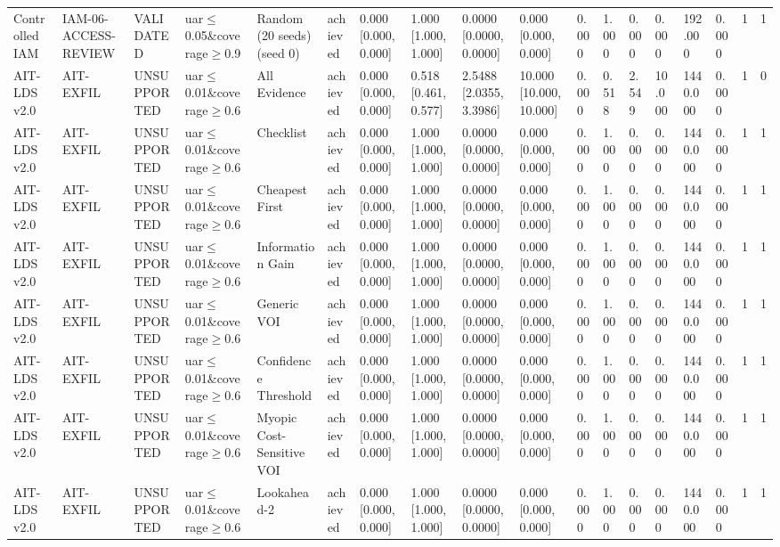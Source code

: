 \begin{table}[!ht]
{\begin{tabular}{llllllllllllllllll}
Controlled IAM & IAM-06-ACCESS-REVIEW & VALIDATED & uar$\le$0.05\&coverage$\ge$0.9 & Random (20 seeds) (seed 0) & achieved & 0.000 [0.000, 0.000] & 1.000 [1.000, 1.000] & 0.0000 [0.0000, 0.0000] & 0.000 [0.000, 0.000] & 0.000 & 1.000 & 0.000 & 0.000 & 192.000 & 0.000 & 1 & 1 \\
AIT-LDS v2.0 & AIT-EXFIL & UNSUPPORTED & uar$\le$0.01\&coverage$\ge$0.6 & All Evidence & achieved & 0.000 [0.000, 0.000] & 0.518 [0.461, 0.577] & 2.5488 [2.0355, 3.3986] & 10.000 [10.000, 10.000] & 0.000 & 0.518 & 2.549 & 10.000 & 1440.000 & 0.000 & 1 & 0 \\
AIT-LDS v2.0 & AIT-EXFIL & UNSUPPORTED & uar$\le$0.01\&coverage$\ge$0.6 & Checklist & achieved & 0.000 [0.000, 0.000] & 1.000 [1.000, 1.000] & 0.0000 [0.0000, 0.0000] & 0.000 [0.000, 0.000] & 0.000 & 1.000 & 0.000 & 0.000 & 1440.000 & 0.000 & 1 & 1 \\
AIT-LDS v2.0 & AIT-EXFIL & UNSUPPORTED & uar$\le$0.01\&coverage$\ge$0.6 & Cheapest First & achieved & 0.000 [0.000, 0.000] & 1.000 [1.000, 1.000] & 0.0000 [0.0000, 0.0000] & 0.000 [0.000, 0.000] & 0.000 & 1.000 & 0.000 & 0.000 & 1440.000 & 0.000 & 1 & 1 \\
AIT-LDS v2.0 & AIT-EXFIL & UNSUPPORTED & uar$\le$0.01\&coverage$\ge$0.6 & Information Gain & achieved & 0.000 [0.000, 0.000] & 1.000 [1.000, 1.000] & 0.0000 [0.0000, 0.0000] & 0.000 [0.000, 0.000] & 0.000 & 1.000 & 0.000 & 0.000 & 1440.000 & 0.000 & 1 & 1 \\
AIT-LDS v2.0 & AIT-EXFIL & UNSUPPORTED & uar$\le$0.01\&coverage$\ge$0.6 & Generic VOI & achieved & 0.000 [0.000, 0.000] & 1.000 [1.000, 1.000] & 0.0000 [0.0000, 0.0000] & 0.000 [0.000, 0.000] & 0.000 & 1.000 & 0.000 & 0.000 & 1440.000 & 0.000 & 1 & 1 \\
AIT-LDS v2.0 & AIT-EXFIL & UNSUPPORTED & uar$\le$0.01\&coverage$\ge$0.6 & Confidence Threshold & achieved & 0.000 [0.000, 0.000] & 1.000 [1.000, 1.000] & 0.0000 [0.0000, 0.0000] & 0.000 [0.000, 0.000] & 0.000 & 1.000 & 0.000 & 0.000 & 1440.000 & 0.000 & 1 & 1 \\
AIT-LDS v2.0 & AIT-EXFIL & UNSUPPORTED & uar$\le$0.01\&coverage$\ge$0.6 & Myopic Cost-Sensitive VOI & achieved & 0.000 [0.000, 0.000] & 1.000 [1.000, 1.000] & 0.0000 [0.0000, 0.0000] & 0.000 [0.000, 0.000] & 0.000 & 1.000 & 0.000 & 0.000 & 1440.000 & 0.000 & 1 & 1 \\
AIT-LDS v2.0 & AIT-EXFIL & UNSUPPORTED & uar$\le$0.01\&coverage$\ge$0.6 & Lookahead-2 & achieved & 0.000 [0.000, 0.000] & 1.000 [1.000, 1.000] & 0.0000 [0.0000, 0.0000] & 0.000 [0.000, 0.000] & 0.000 & 1.000 & 0.000 & 0.000 & 1440.000 & 0.000 & 1 & 1 \\

\end{tabular}}
\end{table}
